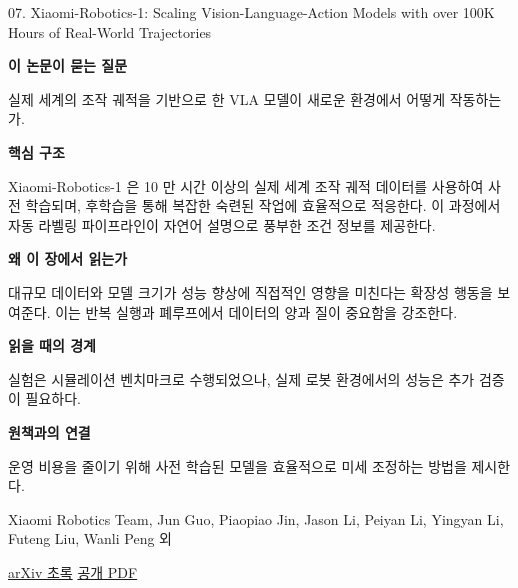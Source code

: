 \documentclass[11pt,openany]{book}
\begin{document}
\begin{termcard}{07. Xiaomi-Robotics-1: Scaling Vision-Language-Action Models with over 100K Hours of Real-World Trajectories}

\par

\medskip

{\sffamily\bfseries\color{deepblue} 이 논문이 묻는 질문}\par

실제 세계의 조작 궤적을 기반으로 한 VLA 모델이 새로운 환경에서 어떻게 작동하는가.

\smallskip

{\sffamily\bfseries\color{deepblue} 핵심 구조}\par

Xiaomi-Robotics-1 은 10 만 시간 이상의 실제 세계 조작 궤적 데이터를 사용하여 사전 학습되며, 후학습을 통해 복잡한 숙련된 작업에 효율적으로 적응한다. 이 과정에서 자동 라벨링 파이프라인이 자연어 설명으로 풍부한 조건 정보를 제공한다.

\smallskip

{\sffamily\bfseries\color{deepblue} 왜 이 장에서 읽는가}\par

대규모 데이터와 모델 크기가 성능 향상에 직접적인 영향을 미친다는 확장성 행동을 보여준다. 이는 반복 실행과 폐루프에서 데이터의 양과 질이 중요함을 강조한다.

\smallskip

{\sffamily\bfseries\color{coral} 읽을 때의 경계}\par

실험은 시뮬레이션 벤치마크로 수행되었으나, 실제 로봇 환경에서의 성능은 추가 검증이 필요하다.

\smallskip

{\sffamily\bfseries\color{teal} 원책과의 연결}\par

운영 비용을 줄이기 위해 사전 학습된 모델을 효율적으로 미세 조정하는 방법을 제시한다.

\medskip

{\footnotesize\color{muted} Xiaomi Robotics Team, Jun Guo, Piaopiao Jin, Jason Li, Peiyan Li, Yingyan Li, Futeng Liu, Wanli Peng 외\par

\href{https://arxiv.org/abs/2607.15330}{arXiv 초록} \quad \href{https://arxiv.org/pdf/2607.15330}{공개 PDF}\par}

\end{termcard}
\end{document}
